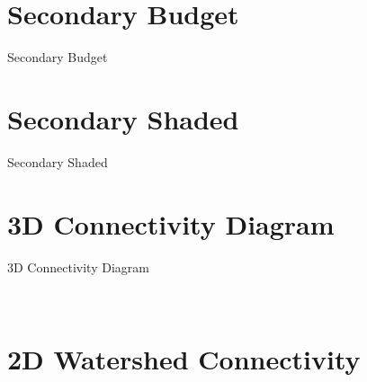 \documentclass[bigger]{beamer}
\begin{document}
\section{Secondary Budget}
  \begin{frame}{Secondary Budget}
    \begin{center}
      \secondarywireframe[1]
    \end{center}
  \end{frame}

\section{Secondary Shaded}
  \begin{frame}{Secondary Shaded}
    \begin{center}
    \end{center}
  \end{frame}

\section{3D Connectivity Diagram}
\begin{frame}{3D Connectivity Diagram}
    \begin{center}
       \\
    \end{center}
  \end{frame}


\section{2D Watershed Connectivity}
\begin{frame}
\begin{columns}[t]
\begin{column}{0.7\textwidth}
\ifdefined\makepng
  \tikzset{png export}
\fi
\begin{figure}\flushleft
      \watershedconnectivity[0.73]
\end{figure}
\end{column}
\begin{column}{0.3\textwidth}
\end{column}
\end{columns}
\end{frame}
\end{document}
